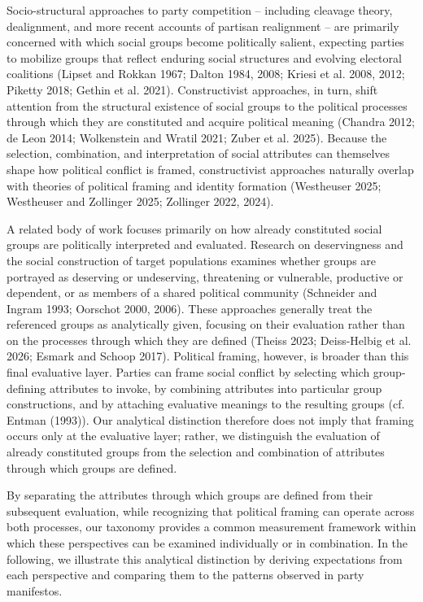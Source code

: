 \documentclass[12pt]{article}
\begin{document}
Socio-structural approaches to party competition -- including cleavage theory, dealignment, and more recent accounts of partisan realignment -- are primarily concerned with which social groups become politically salient, expecting parties to mobilize groups that reflect enduring social structures and evolving electoral coalitions (Lipset and Rokkan 1967; Dalton 1984, 2008; Kriesi et al. 2008, 2012; Piketty 2018; Gethin et al. 2021).
Constructivist approaches, in turn, shift attention from the structural existence of social groups to the political processes through which they are constituted and acquire political meaning (Chandra 2012; de Leon 2014; Wolkenstein and Wratil 2021; Zuber et al. 2025).
Because the selection, combination, and interpretation of social attributes can themselves shape how political conflict is framed, constructivist approaches naturally overlap with theories of political framing and identity formation (Westheuser 2025; Westheuser and Zollinger 2025; Zollinger 2022, 2024).

A related body of work focuses primarily on how already constituted social groups are politically interpreted and evaluated.
Research on deservingness and the social construction of target populations examines whether groups are portrayed as deserving or undeserving, threatening or vulnerable, productive or dependent, or as members of a shared political community (Schneider and Ingram 1993; Oorschot 2000, 2006).
These approaches generally treat the referenced groups as analytically given, focusing on their evaluation rather than on the processes through which they are defined (Theiss 2023; Deiss-Helbig et al. 2026; Esmark and Schoop 2017). 
Political framing, however, is broader than this final evaluative layer.
Parties can frame social conflict by selecting which group-defining attributes to invoke, by combining attributes into particular group constructions, and by attaching evaluative meanings to the resulting groups (cf. Entman (1993)). 
Our analytical distinction therefore does not imply that framing occurs only at the evaluative layer; rather, we distinguish the evaluation of already constituted groups from the selection and combination of attributes through which groups are defined.

By separating the attributes through which groups are defined from their subsequent evaluation, while recognizing that political framing can operate across both processes, our taxonomy provides a common measurement framework within which these perspectives can be examined individually or in combination.
In the following, we illustrate this analytical distinction by deriving expectations from each perspective and comparing them to the patterns observed in party manifestos.
\end{document}
